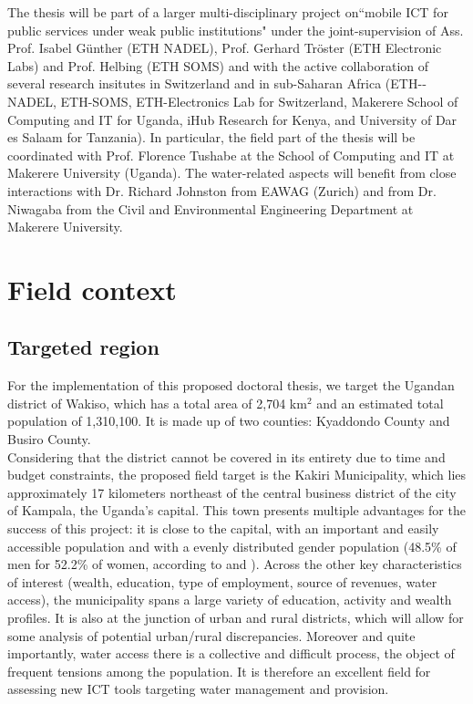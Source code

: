 \documentclass[11pt]{article}
\begin{document}
The thesis will be part of a larger multi-disciplinary project on``mobile ICT for public services under weak public institutions" under the joint-supervision of Ass. Prof. Isabel Günther (ETH NADEL), Prof. Gerhard Tröster (ETH Electronic Labs) and Prof. Helbing (ETH SOMS) and with the active collaboration of several research insitutes in Switzerland and in sub-Saharan Africa (ETH-­NADEL, ETH-­SOMS, ETH-­Electronics Lab for Switzerland, Makerere School of Computing and IT for Uganda, iHub Research for Kenya, and University of Dar es Salaam for Tanzania). In particular, the field part of the thesis will be coordinated with Prof. Florence Tushabe at the School of Computing and IT at Makerere University (Uganda). The water-related aspects will benefit from close interactions with Dr. Richard Johnston from EAWAG (Zurich) and from Dr. Niwagaba from the Civil and Environmental Engineering Department at Makerere University.  

\section{Field context}
\subsection{Targeted region}
For the implementation of this proposed doctoral thesis, we target the Ugandan district of Wakiso, which has a total area of 2,704 km$^{2}$ and an estimated total population of 1,310,100. It is made up of two counties: Kyaddondo County and Busiro County. 
\\
Considering that the district cannot be covered in its entirety due to time and budget constraints, the proposed field target is the Kakiri Municipality, which lies approximately 17 kilometers northeast of the central business district of the city of Kampala, the Uganda's capital. This town presents multiple advantages for the success of this project: it is close to the capital, with an important and easily accessible population and with a evenly distributed gender population (48.5\% of men for 52.2\% of women, according to \citep{population2010} and \citep{population02}). Across the other key characteristics of interest (wealth, education, type of employment, source of revenues, water access), the municipality spans a large variety of education, activity and wealth profiles. It is also at the junction of urban and rural districts, which will allow for some analysis of potential urban/rural discrepancies. Moreover and quite importantly, water access there is a collective and difficult process, the object of frequent tensions among the population. It is therefore an excellent field for assessing new ICT tools targeting water management and provision.
\end{document}
